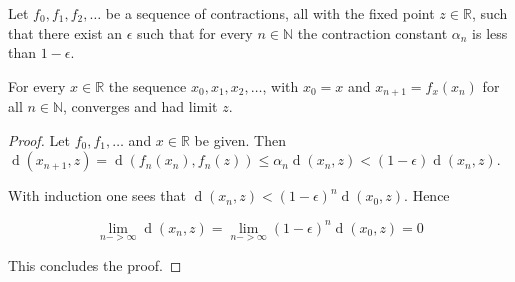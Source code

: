 \begin{theorem}
  Let $f_{0}, f_{1}, f_{2}, \ldots$ be a sequence of contractions, all with the
  fixed point $z\in\mathbb{R}$, such that there exist an $\epsilon$ such that
  for every $n\in\mathbb{N}$ the contraction constant $\alpha_{n}$ is less than
  $1 - \epsilon$.

  For every $x\in\mathbb{R}$ the sequence $x_{0}, x_{1}, x_{2}, \ldots$, with
  $x_{0} = x$ and $x_{n+1} = f_{x}(x_{n})$ for all $n\in\mathbb{N}$, converges and
  had limit $z$.
\end{theorem}

\begin{proof}
  Let $f_{0}, f_{1}, \ldots$ and $x\in\mathbb{R}$ be given. Then
  $\mathop{d}(x_{n+1}, z) = \mathop{d}(f_{n}(x_{n}), f_{n}(z)) \le
  \alpha_{n}\mathop{d}(x_{n}, z) < (1-\epsilon)\mathop{d}(x_{n}, z)$.

  With induction one sees that $\mathop{d}(x_{n}, z) <
  (1-\epsilon)^{n}\mathop{d}(x_{0}, z)$. Hence

  \[
  \lim_{n->\infty}\mathop{d}(x_{n}, z) = \lim_{n->\infty}
  (1-\epsilon)^{n}\mathop{d}(x_{0}, z) = 0
  \]

  This concludes the proof.
\end{proof}

